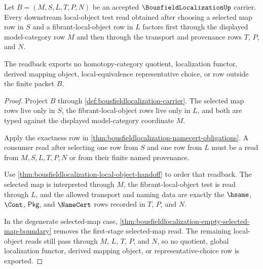 \begin{theorem}
\label{thm:bousfieldlocalization-two-stage-local-object-readback}
Let $B=(M,S,L,T,P,N)$ be an accepted $\BousfieldLocalizationUp$ carrier. Every
downstream local-object test read obtained after choosing a selected map row in
$S$ and a fibrant-local-object row in $L$ factors first through the displayed
model-category row $M$ and then through the transport and provenance rows
$T$, $P$, and $N$.

The readback exports no homotopy-category quotient, localization functor,
derived mapping object, local-equivalence representative choice, or row outside
the finite packet $B$.
\end{theorem}
\begin{proof}
Project $B$ through \autoref{def:bousfieldlocalization-carrier}. The selected
map rows live only in $S$, the fibrant-local-object rows live only in $L$, and
both are typed against the displayed model-category coordinate $M$.

Apply the exactness row in
\autoref{thm:bousfieldlocalization-namecert-obligations}. A consumer read
after selecting one row from $S$ and one row from $L$ must be a read from
$M,S,L,T,P,N$ or from their finite named provenance.

Use \autoref{thm:bousfieldlocalization-local-object-handoff} to order that
readback. The selected map is interpreted through $M$, the fibrant-local-object
test is read through $L$, and the allowed transport and naming data are exactly
the $\hsame$, $\Cont$, $\mathsf{Pkg}$, and $\NameCert$ rows recorded in
$T$, $P$, and $N$.

In the degenerate selected-map case,
\autoref{thm:bousfieldlocalization-empty-selected-map-boundary} removes the
first-stage selected-map read. The remaining local-object reads still pass
through $M$, $L$, $T$, $P$, and $N$, so no quotient, global localization
functor, derived mapping object, or representative-choice row is exported.
\end{proof}

